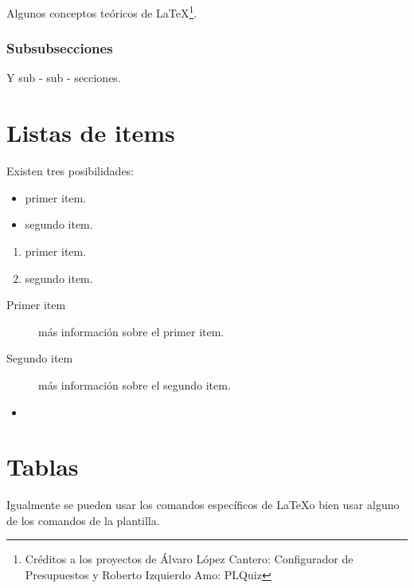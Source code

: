 \indexspace
\indexspace
\indexspace
\indexspace
Algunos conceptos teóricos de \LaTeX \footnote{Créditos a los proyectos de Álvaro López Cantero: Configurador de Presupuestos y Roberto Izquierdo Amo: PLQuiz}.


\subsubsection{Subsubsecciones}

Y sub - sub - secciones. 


\section{Listas de items}

Existen tres posibilidades:

\begin{itemize}
	\item primer item.
	\item segundo item.
\end{itemize}

\begin{enumerate}
	\item primer item.
	\item segundo item.
\end{enumerate}

\begin{description}
	\item[Primer item] más información sobre el primer item.
	\item[Segundo item] más información sobre el segundo item.
\end{description}
	
\begin{itemize}
\item 
\end{itemize}

\section{Tablas}

Igualmente se pueden usar los comandos específicos de \LaTeX o bien usar alguno de los comandos de la plantilla.


